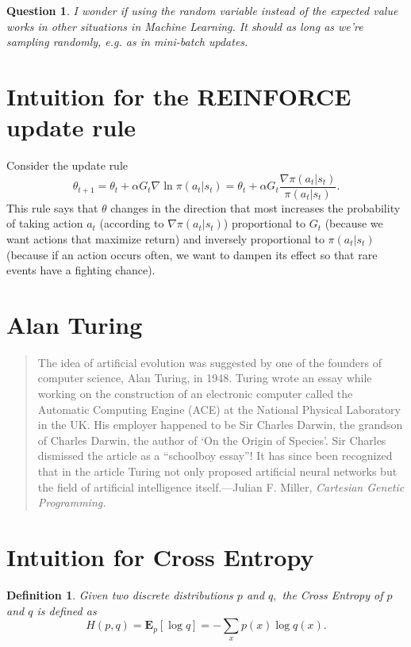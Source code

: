 \documentclass[17pt]{extarticle}
\theoremstyle{plain}
\newtheorem{question}[theorem]{Question}
\newtheorem{definition}[theorem]{Definition}
\theoremstyle{definition}
\theoremstyle{remark}
\newcommand{\bE}{\mathbf E}
\newcommand{\0}{\varnothing}
\newcommand{\<}{\langle}
\renewcommand{\>}{\rangle}
\begin{document}
\begin{question}
  I wonder if using the random variable instead of the expected value works in other situations in Machine Learning. It should as long as we're sampling randomly, e.g. as in mini-batch updates.
\end{question}

\section{Intuition for the REINFORCE update rule}

Consider the update rule \[
\theta_{t+1} = \theta_t + \alpha G_t \nabla \ln \pi(a_t|s_t) = \theta_t + \alpha G_t  \frac{\nabla \pi(a_t|s_t)}{\pi(a_t|s_t)}.
\]
This rule says that $ \theta $ changes in the direction that most increases the probability of taking action $ a_t $ (according to $ \nabla \pi(a_t|s_t) $) proportional to $ G_t $ (because we want actions that maximize return) and inversely proportional to $ \pi(a_t|s_t)$ (because if an action occurs often, we want to dampen its effect so that rare events have a fighting chance).

\section{Alan Turing}

\begin{quote}
  The idea of artificial evolution was suggested by one of the founders of computer science, Alan Turing, in 1948. Turing wrote an essay while working on the construction of an electronic computer called the Automatic Computing Engine (ACE) at the National Physical Laboratory in the UK. His employer happened to be Sir Charles Darwin, the grandson of Charles Darwin, the author of `On the Origin of Species'. Sir Charles dismissed the article as a ``schoolboy essay''! It has since been recognized that in the article Turing not only proposed artificial neural networks but the field of artificial intelligence itself.---Julian F. Miller, \emph{Cartesian Genetic Programming.}
\end{quote}

\section{Intuition for Cross Entropy}

\begin{definition}
Given two discrete distributions $ p $ and $ q, $ the Cross Entropy of $ p $ and $ q $ is defined as \[
H(p, q) = \bE_p[\log q] = - \sum_x p(x) \log q(x).
\]
\end{definition}
\end{document}
